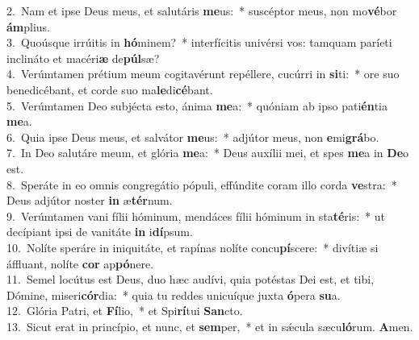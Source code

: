 {2.~}Nam et ipse Deus meus, et salutáris \textbf{me}us:~* suscéptor meus, non mo\textbf{vé}bor \textbf{ám}plius.\\
{3.~}Quoúsque irrúitis in \textbf{hó}minem?~* interfícitis univérsi vos: tamquam paríeti inclináto et macéri\textbf{æ} de\textbf{púl}sæ?\\
{4.~}Verúmtamen prétium meum cogitavérunt repéllere, cucúrri in \textbf{si}ti:~* ore suo benedicébant, et corde suo ma\textbf{le}di\textbf{cé}bant.\\
{5.~}Verúmtamen Deo subjécta esto, ánima \textbf{me}a:~* quóniam ab ipso pati\textbf{én}tia \textbf{me}a.\\
{6.~}Quia ipse Deus meus, et salvátor \textbf{me}us:~* adjútor meus, non \textbf{e}mi\textbf{grá}bo.\\
{7.~}In Deo salutáre meum, et glória \textbf{me}a:~* Deus auxílii mei, et spes \textbf{me}a in \textbf{De}o est.\\
{8.~}Speráte in eo omnis congregátio pópuli, effúndite coram illo corda \textbf{ve}stra:~* Deus adjútor noster \textbf{in} æ\textbf{tér}num.\\
{9.~}Verúmtamen vani fílii hóminum, mendáces fílii hóminum in sta\textbf{té}ris:~* ut decípiant ipsi de vanitáte \textbf{in} i\textbf{dí}psum.\\
{10.~}Nolíte speráre in iniquitáte, et rapínas nolíte concu\textbf{pí}scere:~* divítiæ si áffluant, nolíte \textbf{cor} ap\textbf{pó}nere.\\
{11.~}Semel locútus est Deus, duo hæc audívi, quia potéstas Dei est, et tibi, Dómine, miseri\textbf{cór}dia:~* quia tu reddes unicuíque juxta \textbf{ó}pera \textbf{su}a.\\
{12.~}Glória Patri, et \textbf{Fí}lio,~* et Spi\textbf{rí}tui \textbf{San}cto.\\
{13.~}Sicut erat in princípio, et nunc, et \textbf{sem}per,~* et in sǽcula sæcu\textbf{ló}rum. \textbf{A}men.\\
